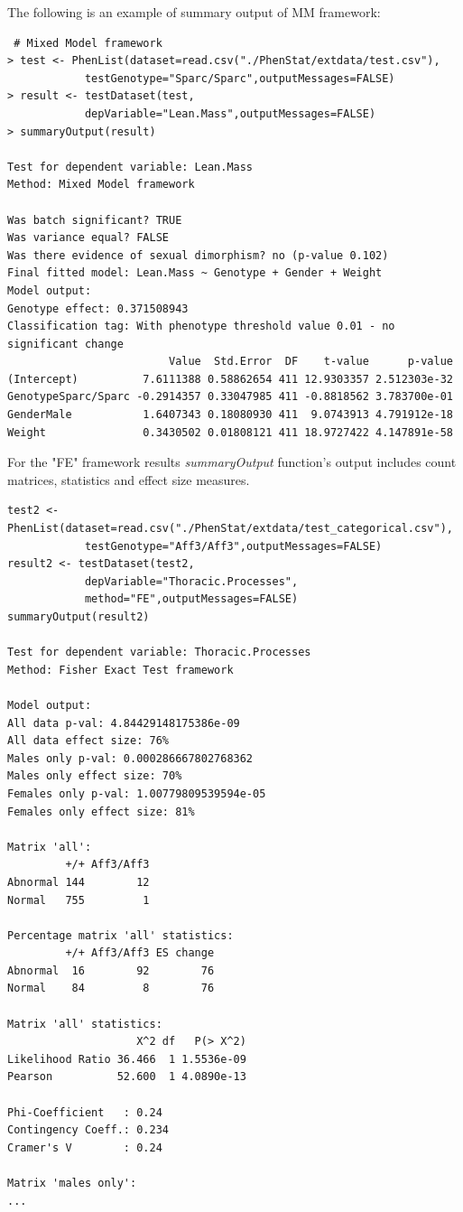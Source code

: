 \documentclass[12pt,a4paper]{article}
\begin{document}
The following is an example of summary output of MM framework:
\begingroup
    \fontsize{8pt}{12pt}\selectfont
\begin{verbatim}
 # Mixed Model framework
> test <- PhenList(dataset=read.csv("./PhenStat/extdata/test.csv"),
            testGenotype="Sparc/Sparc",outputMessages=FALSE)
> result <- testDataset(test,
            depVariable="Lean.Mass",outputMessages=FALSE)
> summaryOutput(result)

Test for dependent variable: Lean.Mass
Method: Mixed Model framework

Was batch significant? TRUE
Was variance equal? FALSE
Was there evidence of sexual dimorphism? no (p-value 0.102)
Final fitted model: Lean.Mass ~ Genotype + Gender + Weight
Model output:
Genotype effect: 0.371508943
Classification tag: With phenotype threshold value 0.01 - no significant change
                         Value  Std.Error  DF    t-value      p-value
(Intercept)          7.6111388 0.58862654 411 12.9303357 2.512303e-32
GenotypeSparc/Sparc -0.2914357 0.33047985 411 -0.8818562 3.783700e-01
GenderMale           1.6407343 0.18080930 411  9.0743913 4.791912e-18
Weight               0.3430502 0.01808121 411 18.9727422 4.147891e-58
\end{verbatim}
\endgroup


For the "FE" framework results \textit{summaryOutput} function's output includes count matrices, statistics and effect size measures.

\begingroup
    \fontsize{8pt}{12pt}\selectfont
\begin{verbatim}
test2 <- PhenList(dataset=read.csv("./PhenStat/extdata/test_categorical.csv"),
            testGenotype="Aff3/Aff3",outputMessages=FALSE)
result2 <- testDataset(test2,
            depVariable="Thoracic.Processes",
            method="FE",outputMessages=FALSE)  
summaryOutput(result2)

Test for dependent variable: Thoracic.Processes
Method: Fisher Exact Test framework

Model output:
All data p-val: 4.84429148175386e-09
All data effect size: 76%
Males only p-val: 0.000286667802768362
Males only effect size: 70%
Females only p-val: 1.00779809539594e-05
Females only effect size: 81%

Matrix 'all':
         +/+ Aff3/Aff3
Abnormal 144        12
Normal   755         1

Percentage matrix 'all' statistics:
         +/+ Aff3/Aff3 ES change
Abnormal  16        92        76
Normal    84         8        76

Matrix 'all' statistics:
                    X^2 df   P(> X^2)
Likelihood Ratio 36.466  1 1.5536e-09
Pearson          52.600  1 4.0890e-13

Phi-Coefficient   : 0.24 
Contingency Coeff.: 0.234 
Cramer's V        : 0.24 

Matrix 'males only':
...
\end{verbatim}
\endgroup
\end{document}
